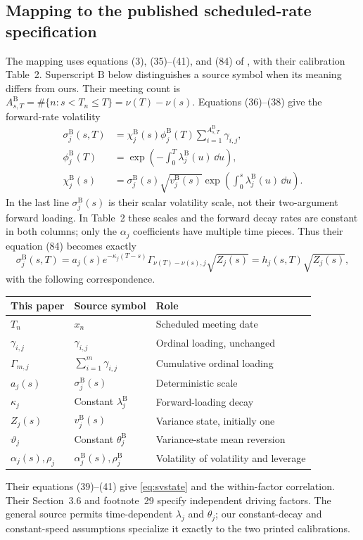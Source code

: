 \subsection{Mapping to the published scheduled-rate specification}\label{app:bgsmapping}
The mapping uses equations (3), (35)--(41), and (84) of \citet{brace2024sofr}, with their calibration Table~2. Superscript $\mathrm B$ below distinguishes a source symbol when its meaning differs from ours. Their meeting count is
$A^{\mathrm B}_{s,T}=\#\{n:s<T_n\leq T\}=\nu(T)-\nu(s)$.
Equations (36)--(38) give the forward-rate volatility
\begin{align*}
\sigma_j^{\mathrm B}(s,T)
 &=\chi_j^{\mathrm B}(s)\phi_j^{\mathrm B}(T)
       \sum_{i=1}^{A^{\mathrm B}_{s,T}}\gamma_{i,j},\\
\phi_j^{\mathrm B}(T)&=\exp\left(-\int_0^T\lambda_j^{\mathrm B}(u)\,\dd u\right),\\
\chi_j^{\mathrm B}(s)&=\sigma_j^{\mathrm B}(s)\sqrt{v_j^{\mathrm B}(s)}
          \exp\left(\int_0^s\lambda_j^{\mathrm B}(u)\,\dd u\right).
\end{align*}
In the last line $\sigma_j^{\mathrm B}(s)$ is their scalar volatility scale, not their two-argument forward loading. In Table~2 these scales and the forward decay rates are constant in both columns; only the $\alpha_j$ coefficients have multiple time pieces. Thus their equation (84) becomes exactly
\[
\sigma_j^{\mathrm B}(s,T)
=a_j(s)e^{-\kappa_j(T-s)}\Gamma_{\nu(T)-\nu(s),j}\sqrt{Z_j(s)}
=h_j(s,T)\sqrt{Z_j(s)},
\]
with the following correspondence.

\begin{center}\small
\begin{tabular}{lll}
\toprule
This paper & Source symbol & Role\\
\midrule
$T_n$ & $x_n$ & Scheduled meeting date\\
$\gamma_{i,j}$ & $\gamma_{i,j}$ & Ordinal loading, unchanged\\
$\Gamma_{m,j}$ & $\sum_{i=1}^{m}\gamma_{i,j}$ & Cumulative ordinal loading\\
$a_j(s)$ & $\sigma_j^{\mathrm B}(s)$ & Deterministic scale\\
$\kappa_j$ & Constant $\lambda_j^{\mathrm B}$ & Forward-loading decay\\
$Z_j(s)$ & $v_j^{\mathrm B}(s)$ & Variance state, initially one\\
$\vartheta_j$ & Constant $\theta_j^{\mathrm B}$ & Variance-state mean reversion\\
$\alpha_j(s),\rho_j$ & $\alpha_j^{\mathrm B}(s),\rho_j^{\mathrm B}$ & Volatility of volatility and leverage\\
\bottomrule
\end{tabular}
\end{center}
Their equations (39)--(41) give \eqref{eq:svstate} and the within-factor correlation. Their Section~3.6 and footnote~29 specify independent driving factors. The general source permits time-dependent $\lambda_j$ and $\theta_j$; our constant-decay and constant-speed assumptions specialize it exactly to the two printed calibrations.

